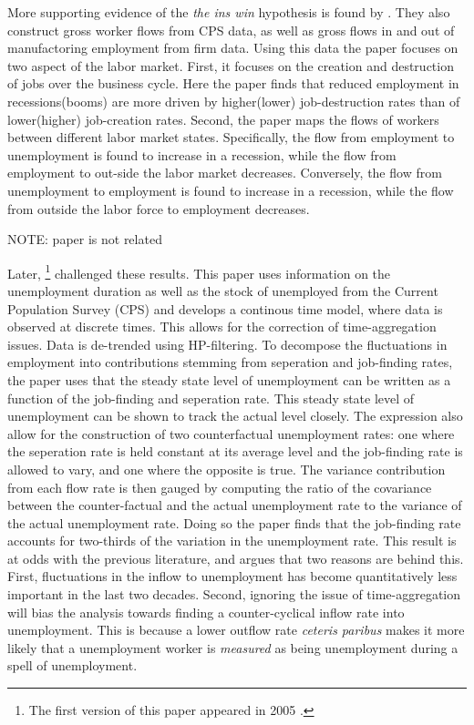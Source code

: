 More supporting evidence of the \emph{the ins win} hypothesis is found by \cite{Blanchard1990}. They also construct gross worker flows from CPS data, as well as gross flows in and out of manufactoring employment from firm data. Using this data the paper focuses on two aspect of the labor market. First, it focuses on the creation and destruction of jobs over the business cycle. Here the paper finds that reduced employment in recessions(booms) are more driven by higher(lower) job-destruction rates than of lower(higher) job-creation rates. Second, the paper maps the flows of workers between different labor market states. Specifically, the flow from employment to unemployment is found to increase in a recession, while the flow from employment to out-side the labor market decreases. Conversely, the flow from unemployment to employment is found to increase in a recession, while the flow from outside the labor force to employment decreases. 

NOTE: \cite{Darby1985} paper is not related

Later, \cite{Shimer2012}\footnote{The first version of this paper appeared in 2005 \citep{Shimer2005b}.}  challenged these results. This paper uses information on the unemployment duration as well as the stock of unemployed from the Current Population Survey (CPS) and develops a continous time model, where data is observed at discrete times. This allows for the correction of time-aggregation issues. Data is de-trended using HP-filtering. To decompose the fluctuations in employment into contributions stemming from seperation and job-finding rates, the paper uses that the steady state level of unemployment can be written as a function of the job-finding and seperation rate. This steady state level of unemployment can be shown to track the actual level closely. The expression also allow for the construction of two counterfactual unemployment rates: one where the seperation rate is held constant at its average level and the job-finding rate is allowed to vary, and one where the opposite is true. The variance contribution from each flow rate is then gauged by computing the ratio of the covariance between the counter-factual and the actual unemployment rate to the variance of the actual unemployment rate. Doing so the paper finds that the job-finding rate accounts for two-thirds of the variation in the unemployment rate. This result is at odds with the previous literature, and \cite{Shimer2012} argues that two reasons are behind this. First, fluctuations in the inflow to unemployment has become quantitatively less important in the last two decades. Second, ignoring the issue of time-aggregation will bias the analysis towards finding a counter-cyclical inflow rate into unemployment. This is because a lower outflow rate \emph{ceteris paribus} makes it more likely that a unemployment worker is  \emph{measured} as being unemployment during a spell of unemployment.

